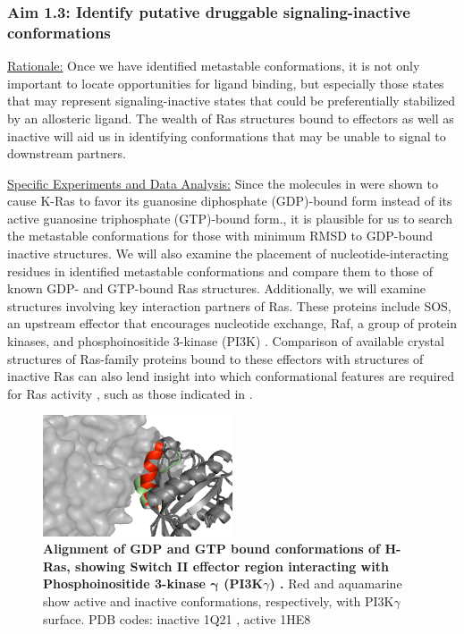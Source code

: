 \documentclass[12pt]{article}
\begin{document}
  \subsubsection*{Aim 1.3: Identify putative druggable signaling-inactive conformations} 
  
  \underline{Rationale:} Once we have identified metastable conformations, it is not only important to locate opportunities for ligand binding, but especially those states that may represent signaling-inactive states that could be preferentially stabilized by an allosteric ligand. The wealth of Ras structures bound to effectors as well as inactive will aid us in identifying conformations that may be unable to signal to downstream partners.
  
  \underline{Specific Experiments and Data Analysis:} Since the molecules in  were shown to cause K-Ras to favor its guanosine diphosphate (GDP)-bound form instead of its active guanosine triphosphate (GTP)-bound form.\cite{ostrem2013}, it is plausible for us to search the metastable conformations for those with minimum RMSD to GDP-bound inactive structures. We will also examine the placement of nucleotide-interacting residues in identified metastable conformations and compare them to those of known GDP- and GTP-bound Ras structures. Additionally, we will examine structures involving key interaction partners of Ras. These proteins include SOS, an upstream effector that encourages nucleotide exchange, Raf, a group of protein kinases, and phosphoinositide 3-kinase (PI3K) \cite{pyla}. Comparison of available crystal structures of Ras-family proteins bound to these effectors with structures of inactive Ras can also lend insight into which conformational features are required for Ras activity \cite{pi3k}, such as those indicated in . 
  \begin{figure}[H]
  \centering
  \includegraphics[width=0.5\textwidth]{new_ras_pi3k.png}
  \caption{\textbf{Alignment of GDP and GTP bound conformations of H-Ras, showing Switch II effector region interacting with Phosphoinositide 3-kinase $\mathbf{\gamma}$ (PI3K$\gamma$) \cite{pi3k}.} Red and aquamarine show active and inactive conformations, respectively, with PI3K$\gamma$ surface. PDB codes: inactive 1Q21 \cite{rasgdp}, active 1HE8 \cite{pi3k}}
  \label{raspi3kinteraction}
  \end{figure}
  
\end{document}
